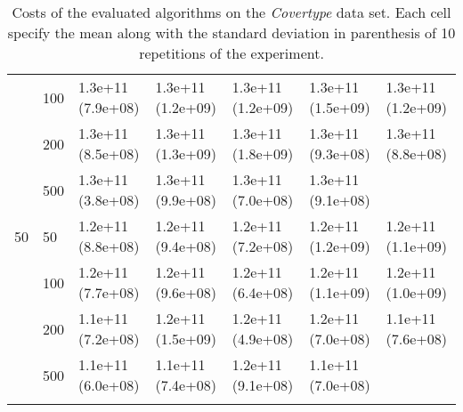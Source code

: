 \begin{longtable}{lllllll}
   & 100 &  1.3e+11 (7.9e+08) &  1.3e+11 (1.2e+09) &  1.3e+11 (1.2e+09) &    1.3e+11 (1.5e+09) &  1.3e+11 (1.2e+09) \\
   & 200 &  1.3e+11 (8.5e+08) &  1.3e+11 (1.3e+09) &  1.3e+11 (1.8e+09) &    1.3e+11 (9.3e+08) &  1.3e+11 (8.8e+08) \\
   & 500 &  1.3e+11 (3.8e+08) &  1.3e+11 (9.9e+08) &  1.3e+11 (7.0e+08) &    1.3e+11 (9.1e+08) &       \\
 \midrule
50 & 50  &  1.2e+11 (8.8e+08) &  1.2e+11 (9.4e+08) &  1.2e+11 (7.2e+08) &    1.2e+11 (1.2e+09) &  1.2e+11 (1.1e+09) \\
   & 100 &  1.2e+11 (7.7e+08) &  1.2e+11 (9.6e+08) &  1.2e+11 (6.4e+08) &    1.2e+11 (1.1e+09) &  1.2e+11 (1.0e+09) \\
   & 200 &  1.1e+11 (7.2e+08) &  1.2e+11 (1.5e+09) &  1.2e+11 (4.9e+08) &    1.2e+11 (7.0e+08) &  1.1e+11 (7.6e+08) \\
   & 500 &  1.1e+11 (6.0e+08) &  1.1e+11 (7.4e+08) &  1.2e+11 (9.1e+08) &    1.1e+11 (7.0e+08) &                 \\
\bottomrule
\caption{Costs of the evaluated algorithms on the \textit{Covertype} data set. Each cell specify the mean along with the standard deviation in parenthesis of 10 repetitions of the experiment.}
\label{tab:real-cost-mean-std-covertype}
\end{longtable}

